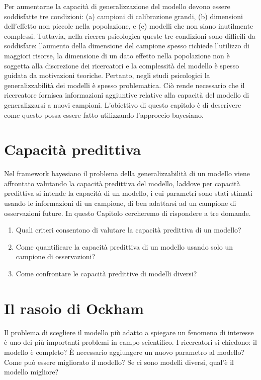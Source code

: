 \documentclass[
  10pt,
  italian,
  a4paper,
  extrafontsizes,onecolumn,openright
  ]{memoir}
\providecommand{\tightlist}{%
  \setlength{\itemsep}{0pt}\setlength{\parskip}{0pt}}
\theoremstyle{definition}
\theoremstyle{definition}
\theoremstyle{definition}
\theoremstyle{definition}
\theoremstyle{remark}
\begin{document}
Per aumentarne la capacità di generalizzazione del modello devono essere soddisfatte tre condizioni: (a) campioni di calibrazione grandi, (b) dimensioni dell'effetto non piccole nella popolazione, e (c) modelli che non siano inutilmente complessi. Tuttavia, nella ricerca psicologica queste tre condizioni sono difficili da soddisfare: l'aumento della dimensione del campione spesso richiede l'utilizzo di maggiori risorse, la dimensione di un dato effetto nella popolazione non è soggetta alla discrezione dei ricercatori e la complessità del modello è spesso guidata da motivazioni teoriche. Pertanto, negli studi psicologici la generalizzabilità dei modelli è spesso problematica. Ciò rende necessario che il ricercatore fornisca informazioni aggiuntive relative alla capacità del modello di generalizzarsi a nuovi campioni. L'obiettivo di questo capitolo è di descrivere come questo possa essere fatto utilizzando l'approccio bayesiano.

\hypertarget{capacituxe0-predittiva}{%
\section{Capacità predittiva}\label{capacituxe0-predittiva}}

Nel framework bayesiano il problema della generalizzabilità di un modello viene affrontato valutando la capacità predittiva del modello, laddove per capacità predittiva si intende la capacità di un modello, i cui parametri sono stati stimati usando le informazioni di un campione, di ben adattarsi ad un campione di osservazioni future. In questo Capitolo cercheremo di rispondere a tre domande.

\begin{enumerate}
\def\labelenumi{\arabic{enumi}.}
\tightlist
\item
  Quali criteri consentono di valutare la capacità predittiva di un modello?
\item
  Come quantificare la capacità predittiva di un modello usando solo un campione di osservazioni?
\item
  Come confrontare le capacità predittive di modelli diversi?
\end{enumerate}

\hypertarget{il-rasoio-di-ockham}{%
\section{Il rasoio di Ockham}\label{il-rasoio-di-ockham}}

Il problema di scegliere il modello più adatto a spiegare un fenomeno di interesse è uno dei più importanti problemi in campo scientifico. I ricercatori si chiedono: il modello è completo? È necessario aggiungere un nuovo parametro al modello? Come può essere migliorato il modello? Se ci sono modelli diversi, qual'è il modello migliore?
\end{document}
